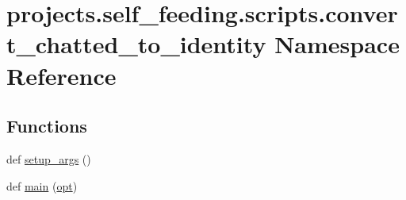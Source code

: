 \hypertarget{namespaceprojects_1_1self__feeding_1_1scripts_1_1convert__chatted__to__identity}{}\section{projects.\+self\+\_\+feeding.\+scripts.\+convert\+\_\+chatted\+\_\+to\+\_\+identity Namespace Reference}
\label{namespaceprojects_1_1self__feeding_1_1scripts_1_1convert__chatted__to__identity}
\subsection*{Functions}
\begin{DoxyCompactItemize}
\item 
def \hyperlink{namespaceprojects_1_1self__feeding_1_1scripts_1_1convert__chatted__to__identity_a2179caf1a41e96bb38cad058863084a3}{setup\+\_\+args} ()
\item 
def \hyperlink{namespaceprojects_1_1self__feeding_1_1scripts_1_1convert__chatted__to__identity_ac409d1c26364c39762dd2357afdaf64a}{main} (\hyperlink{namespaceprojects_1_1self__feeding_1_1scripts_1_1convert__chatted__to__identity_ad9740ff662c28d57014bf3a6625c1a7d}{opt})
\end{DoxyCompactItemize}

